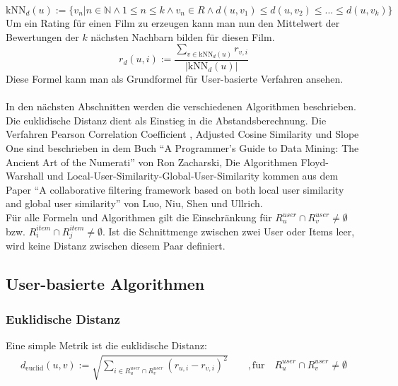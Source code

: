 \begin{equation}
\mathrm{kNN}_{d}(u):=\{v_{n} | n\in \mathbb{N} \land 1\leq n\leq k \land v_{n}\in R \land d(u,v_{1})\leq d(u,v_{2})\leq ... \leq d(u,v_{k})\}
\label{knn}
\end{equation}
Um ein Rating für einen Film zu erzeugen kann man nun den Mittelwert der Bewertungen der $k$ nächsten Nachbarn bilden für diesen Film. 
\begin{equation}
r_{d}(u,i) := \dfrac{\sum\limits_{v \in \mathrm{kNN}_{d}(u)} r_{v,i}}{|\mathrm{kNN}_{d}(u)|}  
\label{rating}
\end{equation}
Diese Formel kann man als Grundformel für User-basierte Verfahren ansehen.\\\\
In den nächsten Abschnitten werden die verschiedenen Algorithmen beschrieben. Die euklidische Distanz dient als Einstieg in die Abstandsberechnung. Die Verfahren Pearson Correlation Coefficient \cite[Kap. 2, S.~23]{G2DM}, Adjusted Cosine Similarity \cite[Kap. 3, S.~16]{G2DM} und Slope One \cite[Kap. 3, S.~28]{G2DM} sind beschrieben in dem Buch "`A Programmer's Guide to Data Mining: The Ancient Art of the Numerati"' \cite{G2DM} von Ron Zacharski, Die Algorithmen Floyd-Warshall und Local-User-Similarity-Global-User-Similarity kommen aus dem Paper "`A collaborative filtering framework based on both local user similarity and global user similarity"' \cite{cf} von Luo, Niu, Shen und Ullrich.\\
Für alle Formeln und Algorithmen gilt die Einschränkung für $R^{user}_{u}\cap R^{user}_{v} \neq \emptyset$ bzw. $R^{item}_{i}\cap R^{item}_{j} \neq \emptyset$. Ist die Schnittmenge zwischen zwei User oder Items leer, wird keine Distanz zwischen diesem Paar definiert.

\subsection{User-basierte Algorithmen}
\subsubsection{Euklidische Distanz}\label{s.euclid}
Eine simple Metrik ist die euklidische Distanz:
	\begin{equation}
	\begin{aligned}
	d_{\mathrm{euclid}}(u,v) := \sqrt{\sum\limits_{i \in R^{user}_{u}\cap R^{user}_{v}} (r_{u,i}-r_{v,i})^2  }
	\qquad \mathrm{, f\ddot{u}r }\quad R^{user}_{u}\cap R^{user}_{v} \neq \emptyset
	\label{euclid}
	\end{aligned}
	\end{equation}

